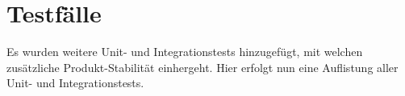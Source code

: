 \FloatBarrier
\section{Testfälle}

Es wurden weitere Unit- und Integrationstests hinzugefügt, mit welchen zusätzliche Produkt-Stabilität einhergeht. Hier erfolgt nun eine Auflistung aller Unit- und Integrationstests.







